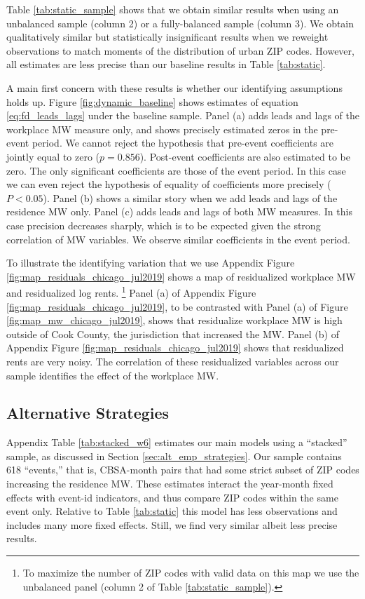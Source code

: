 Table \ref{tab:static_sample} shows that we obtain similar results when
using an unbalanced sample (column 2) or a fully-balanced sample (column 3).
We obtain qualitatively similar but statistically insignificant results when
we reweight observations to match moments of the distribution of urban ZIP 
codes.
However, all estimates are less precise than our baseline results in Table 
\ref{tab:static}.

A main first concern with these results is whether our identifying assumptions 
holds up.
Figure \ref{fig:dynamic_baseline} shows estimates of equation 
\eqref{eq:fd_leads_lags} under the baseline sample.
Panel (a) adds leads and lags of the workplace MW measure only, and shows
precisely estimated zeros in the pre-event period.
We cannot reject the hypothesis that pre-event coefficients are jointly equal
to zero ($p = 0.856$).
Post-event coefficients are also estimated to be zero.
The only significant coefficients are those of the event period.
In this case we can even reject the hypothesis of equality of coefficients more
precisely ($P<0.05$).
Panel (b) shows a similar story when we add leads and lags of the residence MW
only.
Panel (c) adds leads and lags of both MW measures.
In this case precision decreases sharply, which is to be expected given the
strong correlation of MW variables.
We observe similar coefficients in the event period.

To illustrate the identifying variation that we use 
Appendix Figure \ref{fig:map_residuals_chicago_jul2019} shows a map of 
residualized workplace MW and residualized log rents.%
\footnote{To maximize the number of ZIP codes with valid data on this map we
use the unbalanced panel (column 2 of Table \ref{tab:static_sample}).}
Panel (a) of Appendix Figure \ref{fig:map_residuals_chicago_jul2019}, to be 
contrasted with Panel (a) of Figure \ref{fig:map_mw_chicago_jul2019}, 
shows that residualize workplace MW is high outside of Cook County, the 
jurisdiction that increased the MW.
Panel (b) of Appendix Figure \ref{fig:map_residuals_chicago_jul2019} shows that 
residualized rents are very noisy.
The correlation of these residualized variables across our sample identifies
the effect of the workplace MW.

\subsection{Alternative Strategies}

Appendix Table \ref{tab:stacked_w6} estimates our main models using a ``stacked''
sample, as discussed in Section \ref{sec:alt_emp_strategies}.
Our sample contains 618 ``events,'' that is, CBSA-month pairs that had some 
strict subset of ZIP codes increasing the residence MW.
These estimates interact the year-month fixed effects with event-id indicators, 
and thus compare ZIP codes within the same event only.
Relative to Table \ref{tab:static} this model has less observations and includes 
many more fixed effects.
Still, we find very similar albeit less precise results.

